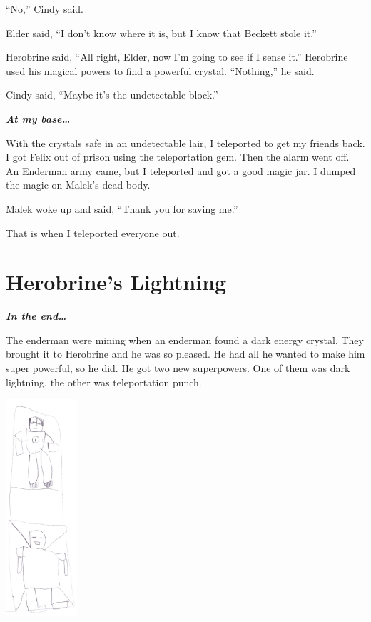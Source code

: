 \documentclass[12pt,oneside]{krantz}
\begin{document}
``No,'' Cindy said.

Elder said, ``I don't know where it is, but I know that Beckett stole
it.''

Herobrine said, ``All right, Elder, now I'm going to see if I sense
it.'' Herobrine used his magical powers to find a powerful crystal.
``Nothing,'' he said.

Cindy said, ``Maybe it's the undetectable block.''

\textbf{\emph{At my base\ldots{}}}

With the crystals safe in an undetectable lair, I teleported to get my
friends back. I got Felix out of prison using the teleportation gem.
Then the alarm went off. An Enderman army came, but I teleported and got
a good magic jar. I dumped the magic on Malek's dead body.

Malek woke up and said, ``Thank you for saving me.''

That is when I teleported everyone out.

\hypertarget{herobrines-lightning}{%
\chapter{Herobrine's Lightning}\label{herobrines-lightning}}

\textbf{\emph{In the end\ldots{}}}

The enderman were mining when an enderman found a dark energy crystal.
They brought it to Herobrine and he was so pleased. He had all he wanted
to make him super powerful, so he did. He got two new superpowers. One
of them was dark lightning, the other was teleportation punch.

\includegraphics[width=1.04167in,height=\textheight]{img/dark-lightning.jpg}
\end{document}
